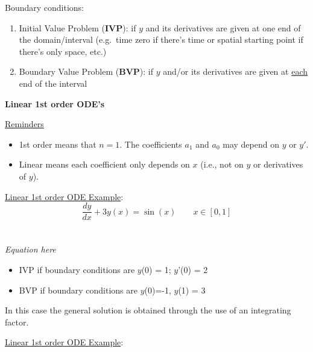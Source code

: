 \documentclass[12pt]{exam}
\begin{document}
Boundary conditions:
\begin{enumerate}
\item Initial Value Problem (\textbf{IVP}): if $y$ and its derivatives are given at one end of the domain/interval (e.g.\ time zero if there's time or spatial starting point if there's only space, etc.)
\item Boundary Value Problem (\textbf{BVP}): if $y$ and/or its derivatives are given at \underline{each} end of the interval
\end{enumerate}

\vspace*{1em}
\textbf{Linear 1st order ODE's}

\underline{Reminders}
\begin{itemize}
\item 1st order means that $n=1$. The  coefficients $a_1$ and $a_0$ may depend on $y$ or $y'$.
\item Linear means each coefficient only depends on $x$ (i.e., not on $y$ or derivatives of $y$).
\end{itemize}

\underline{Linear 1st order ODE Example}:
\ifprintanswers
\begin{equation}
\frac{dy}{dx} + 3y(x) = \sin(x) \qquad x \in [0, 1] \nonumber
\end{equation}
\else
 \\ \\ 
 \hspace*{8em}\textit{Equation here}
\fi
%
%
\begin{itemize}
\item IVP if boundary conditions are $y$(0) = 1; $y$'(0) = 2
\item BVP if boundary conditions are $y$(0)=-1, $y$(1) = 3 
\end{itemize}
%
In this case the general solution is obtained through the use of an integrating factor.

\vspace*{1em}
\noindent \underline{Linear 1st order ODE Example}:
\end{document}

